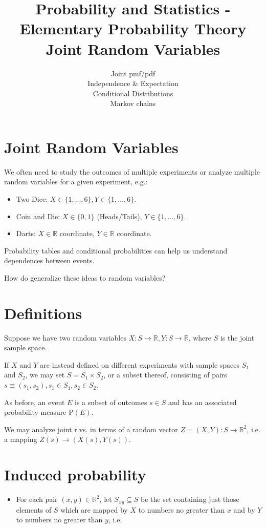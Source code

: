 \documentclass[10pt]{article}
\title{Probability and Statistics - Elementary Probability Theory \\
 Joint Random Variables }
\author{Joint pmf/pdf\\
Independence \& Expectation\\
Conditional Distributions\\
Markov chains}
\date{}
\begin{document}
\maketitle


\section*{Joint Random Variables}
We often need to study the outcomes of multiple experiments or analyze multiple random variables for a given experiment, e.g.:

\begin{itemize}
  \item Two Dice: $X \in\{1, \ldots, 6\}, Y \in\{1, \ldots, 6\}$.
  \item Coin and Die: $X \in\{0,1\}$ (Heads/Tails), $Y \in\{1, \ldots, 6\}$.
  \item Darts: $X \in \mathbb{R}$ coordinate, $Y \in \mathbb{R}$ coordinate.
\end{itemize}

Probability tables and conditional probabilities can help us understand dependences between events.

How do generalize these ideas to random variables?

\section*{Definitions}
Suppose we have two random variables $X: S \rightarrow \mathbb{R}, Y: S \rightarrow \mathbb{R}$, where $S$ is the joint sample space.

If $X$ and $Y$ are instead defined on different experiments with sample spaces $S_{1}$ and $S_{2}$, we may set $S=S_{1} \times S_{2}$, or a subset thereof, consisting of pairs $s \equiv\left(s_{1}, s_{2}\right), s_{1} \in S_{1}, s_{2} \in S_{2}$.

As before, an event $E$ is a subset of outcomes $s \in S$ and has an associated probability measure $\mathrm{P}(E)$.

We may analyze joint r.vs. in terms of a random vector $Z=(X, Y): S \rightarrow \mathbb{R}^{2}$, i.e. a mapping $Z(s) \rightarrow(X(s), Y(s))$.

\section*{Induced probability}
\begin{itemize}
  \item For each pair $(x, y) \in \mathbb{R}^{2}$, let $S_{x y} \subseteq S$ be the set containing just those elements of $S$ which are mapped by $X$ to numbers no greater than $x$ and by $Y$ to numbers no greater than $y$, i.e.
\end{itemize}
\end{document}
